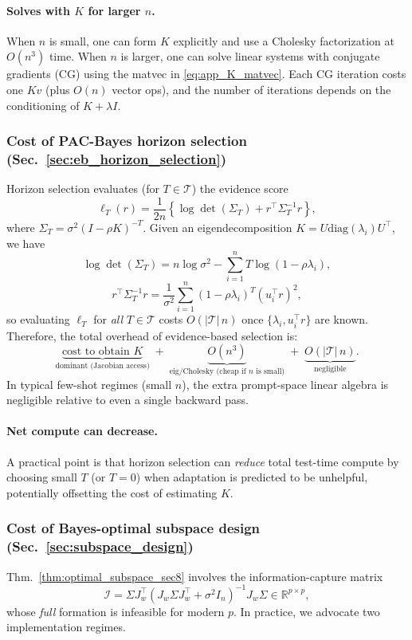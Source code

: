 \documentclass{article}
\theoremstyle{plain}
\theoremstyle{definition}
\theoremstyle{remark}
\begin{document}
\paragraph{Solves with $K$ for larger $n$.}
When $n$ is small, one can form $K$ explicitly and use a Cholesky factorization at $O(n^3)$ time.
When $n$ is larger, one can solve linear systems with conjugate gradients (CG) using the matvec in
\eqref{eq:app_K_matvec}. Each CG iteration costs one $Kv$ (plus $O(n)$ vector ops), and the number of iterations
depends on the conditioning of $K+\lambda I$.

\subsubsection{Cost of PAC-Bayes horizon selection (Sec.~\ref{sec:eb_horizon_selection})}
Horizon selection evaluates (for $T\in\mathcal T$) the evidence score
\[
\ell_T(r)=\frac{1}{2n}\left\{\log\det(\Sigma_T)+r^\top\Sigma_T^{-1}r\right\},
\]
where
$\Sigma_T=\sigma^2(I-\rho K)^{-T}$.
Given an eigendecomposition $K=U\mathrm{diag}(\lambda_i)U^\top$, we have
\[
\log\det(\Sigma_T)=n\log\sigma^2 - \sum_{i=1}^n T\log(1-\rho\lambda_i),
\]
\[
r^\top\Sigma_T^{-1}r
=\frac{1}{\sigma^2}\sum_{i=1}^n (1-\rho\lambda_i)^T (u_i^\top r)^2,
\]
so evaluating $\ell_T$ for \emph{all} $T\in\mathcal T$ costs $O(|\mathcal T|\,n)$ once $\{\lambda_i,u_i^\top r\}$ are known.
Therefore, the total overhead of evidence-based selection is:
\[
\underbrace{\text{cost to obtain }K}_{\text{dominant (Jacobian access)}}\;+\;
\underbrace{O(n^3)}_{\text{eig/Cholesky (cheap if $n$ is small)}}\;+\;
\underbrace{O(|\mathcal T|\,n)}_{\text{negligible}}.
\]
In typical few-shot regimes (small $n$), the extra prompt-space linear algebra is negligible relative to even a
single backward pass.

\paragraph{Net compute can decrease.}
A practical point is that horizon selection can \emph{reduce} total test-time compute by choosing small $T$ (or $T=0$)
when adaptation is predicted to be unhelpful, potentially offsetting the cost of estimating $K$.

\subsubsection{Cost of Bayes-optimal subspace design (Sec.~\ref{sec:subspace_design})}
Thm.~\ref{thm:optimal_subspace_sec8} involves the information-capture matrix
\[
\mathcal I=\Sigma J_w^\top(J_w\Sigma J_w^\top+\sigma^2 I_n)^{-1}J_w\Sigma\in\mathbb{R}^{p\times p},
\]
whose \emph{full} formation is infeasible for modern $p$. In practice, we advocate two implementation regimes.
\end{document}
